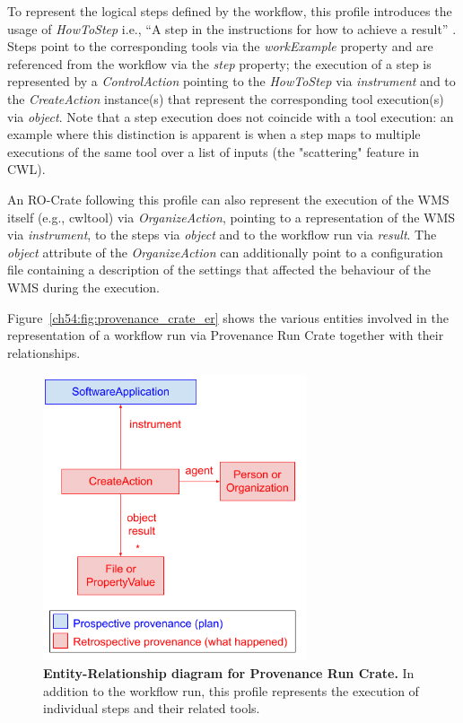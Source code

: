 To represent the logical steps defined by the workflow, this profile introduces the usage of \emph{HowToStep} i.e., “A step in the instructions for how to achieve a result” .
Steps point to the corresponding tools via the \emph{workExample} property and are referenced from the workflow via the \emph{step} property; the execution of a step is represented by a \emph{ControlAction} pointing to the
\emph{HowToStep} via \emph{instrument} and to the \emph{CreateAction}
instance(s) that represent the corresponding tool execution(s) via
\emph{object}.
Note that a step execution does not coincide with a tool execution: an example where this distinction is apparent is when a step maps to multiple executions of the same tool over a list of inputs (the "scattering" feature in CWL).

An RO-Crate following this profile can also represent the execution of the WMS itself (e.g., cwltool) via
\emph{OrganizeAction}, pointing to a representation of the WMS via
\emph{instrument}, to the steps via \emph{object} and to the workflow run via \emph{result}.
The \emph{object} attribute of the
\emph{OrganizeAction} can additionally point to a configuration file containing a description of the settings that affected the behaviour of the WMS during the execution.

Figure~\vref{ch54:fig:provenance_crate_er} shows the various entities involved in the representation of a workflow run via Provenance Run Crate together with their relationships.

\begin{figure}[!h]
\includegraphics[width=21em]{figures/ch54/image4.png}
\caption{{\bf Entity-Relationship diagram for Provenance Run Crate.}
In addition to the workflow run, this profile represents the execution of individual steps and their related tools.}
\label{ch54:fig:provenance_crate_er}
\end{figure}

